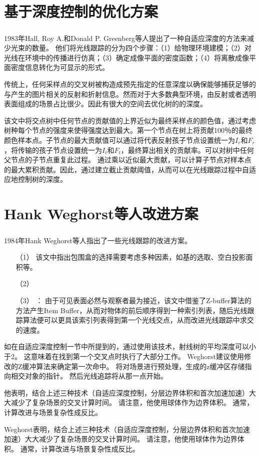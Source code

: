 \documentclass[11pt]{article}
\newcommand{\upcite}[1]{\textsuperscript{\textsuperscript{\cite{#1}}}}
\begin{document}
\section{基于深度控制的优化方案}
1983年Hall, Roy A.和Donald P. Greenberg\upcite{Hall}等人提出了一种自适应深度的方法来减少光束的数量。
他们将光线跟踪的分为四个步骤：（1）给物理环境建模；（2）对光线在环境中的传播进行仿真；（3）确定成像平面的密度函数；（4）将离散成像平面密度信息转化为可显示的形式。
\par 传统上，任何采样点的交叉树被构造成预先指定的任意深度以确保能够捕获足够的与产生的图片相关的反射和折射信息。然而对于大多数典型环境，由反射或者透明表面组成的场景占比很少。因此有很大的空间去优化树的的深度。
\par 该文中将交点树中任何节点的贡献值的上界近似为最终采样点的颜色值，通过考虑树种每个节点的强度来使得强度达到最大。第一个节点在树上将贡献100％的最终颜色样本点。子节点的最大贡献值可以通过将代表反射孩子节点设置统一为$I_r$和$F_r$，将传输的孩子节点设置统一为$I_t$和$F_t$，最终算出相关的贡献率。可以对树中任何父节点的子节点重复此过程。 通过乘以近似最大贡献，可以计算子节点对样本点的最大累积贡献。因此，通过建立截止贡献阈值，从而可以在光线跟踪过程中自适应地控制树的深度。

\section{Hank Weghorst等人改进方案}
1984年Hank Weghorst等人\upcite{Hank}指出了一些光线跟踪的改进方案。


\begin{itemize}
\item[（1）]{}该文中指出包围盒的选择需要考虑多种因素，如基的选取、空白投影面积等。
\item[（2）]{}
\item[（3）]{}：
由于可见表面必然与观察者最为接近，该文中借鉴了Z-buffer算法的方法产生Item Buffer，从而对物体的前后顺序得到一种索引列表，随后光线跟踪算法便可以更具该索引列表得到第一个光线交点，从而改进光线跟踪中求交的速度。
\end{itemize}

如在自适应深度控制一节中所提到的，通过使用该技术，射线树的平均深度可以小于2。 这意味着在找到第一个交叉点时执行了大部分工作。 Weghorst建议使用修改的Z缓冲算法来确定第一次命中。 将对场景进行预处理，生成的z缓冲区存储指向相交对象的指针。 然后光线追踪将从那一点开始。
\par 他表明，结合上述三种技术（自适应深度控制，分层边界体积和首次加速加速）大大减少了复杂场景的交叉计算时间。 请注意，他使用球体作为边界体积。 通常，计算改进与场景复杂性成反比。
\par Weghorst表明，结合上述三种技术（自适应深度控制，分层边界体积和首次加速加速）大大减少了复杂场景的交叉计算时间。 请注意，他使用球体作为边界体积。 通常，计算改进与场景复杂性成反比。
\end{document}
